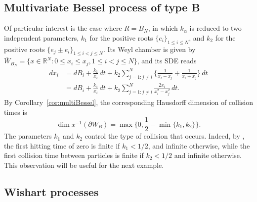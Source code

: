 \documentclass{article}
\numberwithin{equation}{section}
\newcommand{\R}{\mathbb{R}}
\newcommand{\C}{W}
\newcommand{\Cc}{\overline{W}}
\newcommand{\Cb}{\partial \C}
\theoremstyle{plain}
\begin{document}
    \subsection{Multivariate Bessel process of type B}
    Of particular interest is the case where $R=B_N$, in which $k_\alpha$ is reduced to two independent parameters, $k_1$ for the positive roots $\{e_i\}_{1\leq i\leq N}$, and $k_2$ for the positive roots $\{e_j\pm e_i\}_{1\leq i<j\leq N}$. Its Weyl chamber is given by $\Cc _{B_N}=\{x\in\R^N:0\leq x_i\leq x_j, 1\leq i<j\leq N\}$, and its SDE reads
    \begin{align*}
        dx_i&=dB_i+\frac{k_1}{x_i}\,dt+k_2\sum_{j=1:j\neq i}^N \Big\{\frac{1}{x_i-x_j}+\frac{1}{x_i+x_j}\Big\}\,dt\\
        &=dB_i+\frac{k_1}{x_i}\,dt+k_2\sum_{j=1:j\neq i}^N \frac{2x_i}{x_i^2-x_j^2}\,dt.
    \end{align*}
    By Corollary~\ref{cor:multiBessel}, the corresponding Hausdorff dimension of collision times is
    \[\dim x^{-1}(\Cb_B)=\max\Big\{0,\frac12-\min\{k_1,k_2\}\Big\}.\]
    The parameters $k_1$ and $k_2$ control the type of collision that occurs. Indeed, by \cite[Prop.~1]{Demni09}, the first hitting time of zero is finite if $k_1<1/2$, and infinite otherwise, while the first collision time between particles is finite if $k_2<1/2$ and infinite otherwise. This observation will be useful for the next example.
    
    \subsection{Wishart processes}
    
\end{document}
